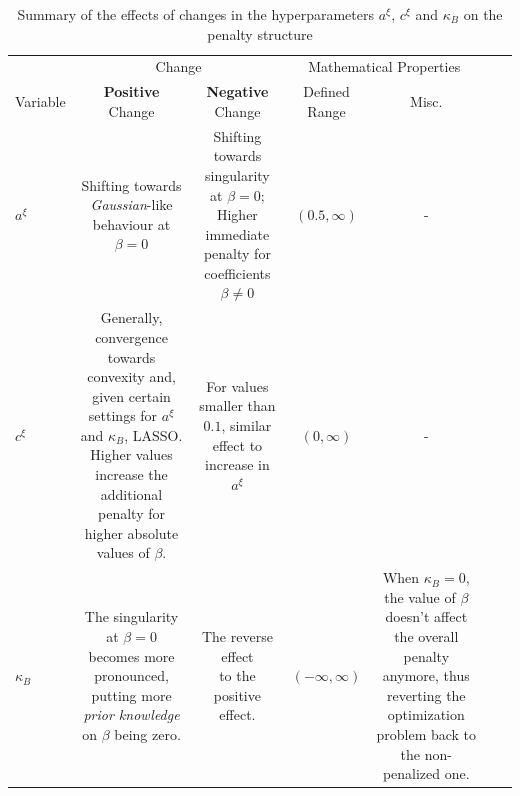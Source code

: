\documentclass[12pt,a4paper]{article}
\begin{document}
\newpage
\begin{landscape}
\hspace{3cm}
\begin{table}[h!]
\centering
\begin{tabular}{lcccccc}\toprule
		& \multicolumn{2}{c}{Change} & \multicolumn{2}{c}{Mathematical Properties}\\
		\cmidrule(r{4pt}){2-3} \cmidrule(l){4-5}
Variable     	& \textbf{Positive} Change  & \textbf{Negative} Change & Defined Range & Misc.\\\midrule
$a^\xi$  	& \makecell{Shifting towards\\ \textit{Gaussian}-like behaviour\\ at $\beta = 0$} & \makecell{Shifting towards singularity\\ at $\beta = 0$; Higher\\ immediate penalty\\ for coefficients\\ $\beta \neq 0$} & $(0.5, \infty)$ & -\\
$c^\xi$ 		& \makecell{Generally, convergence towards \\ convexity and, given certain \\ settings for $a^\xi$ and\\ $\kappa_B$, LASSO. Higher values\\ increase the additional penalty\\ for higher absolute values of $\beta$.} &  \makecell{For values smaller \\ than $0.1$, similar effect\\ to increase in $a^\xi$} & $(0, \infty)$ & - \\
$\kappa_B$ 	& \makecell{The singularity\\ at $\beta=0$ becomes more\\ pronounced, putting more\\ \textit{prior knowledge} on $\beta$\\ being zero.} & \makecell{The reverse effect\\ to the positive effect.} & $(-\infty, \infty)$ & \makecell{When $\kappa_B=0$, the\\ value of $\beta$ doesn't affect\\ the overall penalty anymore,\\ thus reverting the optimization\\ problem back to the\\ non-penalized one.} \\\bottomrule
\end{tabular}
\caption{Summary of the effects of changes in the hyperparameters $a^\xi$, $c^\xi$ and $\kappa_B$ on the penalty structure}
\label{tab:VariationsInHyperparameters}
\end{table}
\end{landscape}
\end{document}
